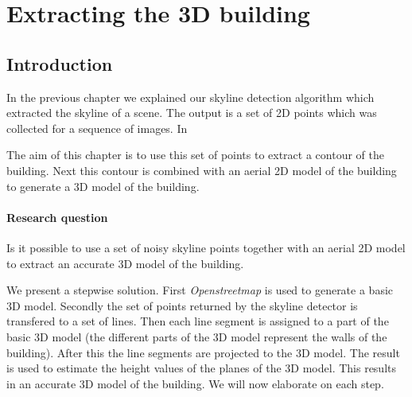 


\section{Extracting the 3D building}


\label{generate3dModel}
\subsection{Introduction}
In the previous chapter we explained our skyline detection algorithm which
extracted the skyline of a scene. The output is a set of 2D points which was  
collected for a sequence of images.
In 

The aim of this chapter is to use this set of points to extract a contour of
the building. 
Next this contour is combined with an aerial 2D model of the building to
generate a 3D model of the building.\\

\paragraph{Research question}
Is it possible to use a set of noisy skyline points together with an aerial 2D model to 
extract an accurate 3D model of the building.

We present a stepwise solution. First \emph{Openstreetmap} is used to generate a
basic 3D model. Secondly the set of points returned by the skyline detector is
transfered to a set of lines. Then each line segment is assigned to a part of
the basic 3D model (the different parts of the 3D model represent the walls of
the building).  After this the line segments are projected to the 3D model. The
result is used to estimate the height values of the planes of the 3D model.
This results in an accurate 3D model of the building.
We will now elaborate on each step.\\



